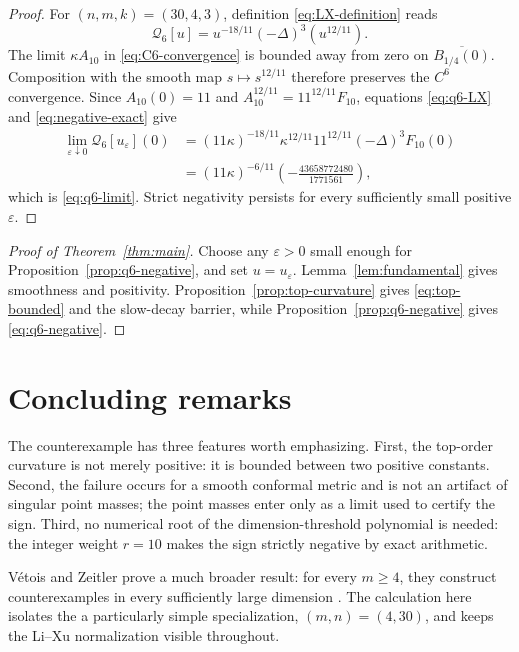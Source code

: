 \documentclass[11pt,reqno]{amsart}
\theoremstyle{remark}
\newcommand{\Qlx}{\mathcal{Q}}
\newcommand{\eps}{\varepsilon}
\begin{document}
\begin{proof}
For \((n,m,k)=(30,4,3)\), definition \eqref{eq:LX-definition} reads
\begin{equation}\label{eq:q6-LX}
 \Qlx_6[u]
 =u^{-18/11}(-\Delta)^3(u^{12/11}).
\end{equation}
The limit \(\kappa A_{10}\) in \eqref{eq:C6-convergence} is bounded
away from zero on \(\overline{B_{1/4}(0)}\).  Composition with the smooth
map \(s\mapsto s^{12/11}\) therefore preserves the \(C^6\) convergence.
Since \(A_{10}(0)=11\) and
\(A_{10}^{12/11}=11^{12/11}F_{10}\), equations
\eqref{eq:q6-LX} and \eqref{eq:negative-exact} give
\begin{align*}
 \lim_{\eps\downarrow0}\Qlx_6[u_\eps](0)
 &=(11\kappa)^{-18/11}\kappa^{12/11}11^{12/11}
   (-\Delta)^3F_{10}(0)\\
 &=(11\kappa)^{-6/11}
   \left(-\frac{43658772480}{1771561}\right),
\end{align*}
which is \eqref{eq:q6-limit}.  Strict negativity persists for every
sufficiently small positive \(\eps\).
\end{proof}

\begin{proof}[Proof of Theorem~\ref{thm:main}]
Choose any \(\eps>0\) small enough for
Proposition~\ref{prop:q6-negative}, and set \(u=u_\eps\).
Lemma~\ref{lem:fundamental} gives smoothness and positivity.
Proposition~\ref{prop:top-curvature} gives
\eqref{eq:top-bounded} and the slow-decay barrier, while
Proposition~\ref{prop:q6-negative} gives \eqref{eq:q6-negative}.
\end{proof}

\section{Concluding remarks}

The counterexample has three features worth emphasizing.  First, the
top-order curvature is not merely positive: it is bounded between two
positive constants.  Second, the failure occurs for a smooth conformal
metric and is not an artifact of singular point masses; the point masses
enter only as a limit used to certify the sign.  Third, no numerical root
of the dimension-threshold polynomial is needed: the integer weight
\(r=10\) makes the sign strictly negative by exact arithmetic.

V\'etois and Zeitler prove a much broader result: for every \(m\geq4\),
they construct counterexamples in every sufficiently large dimension
\cite[Theorem~1.2]{VetoisZeitler}.  The calculation here isolates the
a particularly simple specialization, \((m,n)=(4,30)\), and keeps the
Li--Xu normalization visible throughout.
\end{document}
